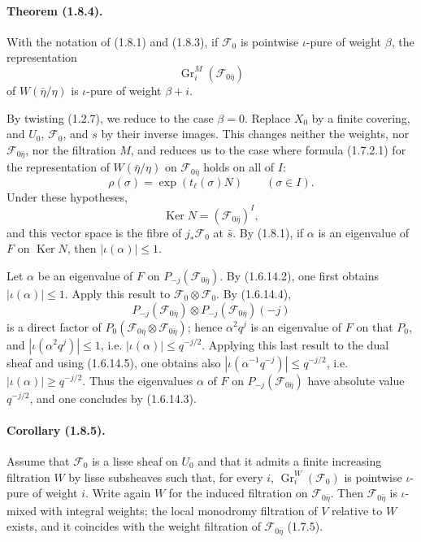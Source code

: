 \documentclass[11pt]{article}
\theoremstyle{remark}
\newcommand{\Gr}{\operatorname{Gr}}
\newcommand{\Ker}{\operatorname{Ker}}
\begin{document}
\paragraph{Theorem (1.8.4).}
With the notation of (1.8.1) and (1.8.3), if $\mathcal F_0$ is pointwise $\iota$-pure of weight $\beta$, the representation
\[
\Gr^M_i(\mathcal F_{0\bar\eta})
\]
of $W(\bar\eta/\eta)$ is $\iota$-pure of weight $\beta+i$.

By twisting (1.2.7), we reduce to the case $\beta=0$. Replace $X_0$ by a finite covering, and $U_0$, $\mathcal F_0$, and $s$ by their inverse images. This changes neither the weights, nor $\mathcal F_{0\bar\eta}$, nor the filtration $M$, and reduces us to the case where formula (1.7.2.1) for the representation of $W(\bar\eta/\eta)$ on $\mathcal F_{0\bar\eta}$ holds on all of $I$:
\[
\rho(\sigma)=\exp(t_\ell(\sigma)N)\qquad(\sigma\in I).
\]
Under these hypotheses,
\[
\Ker N=(\mathcal F_{0\bar\eta})^I,
\]
and this vector space is the fibre of $j_{*}\mathcal F_0$ at $\bar s$. By (1.8.1), if $\alpha$ is an eigenvalue of $F$ on $\Ker N$, then $|\iota(\alpha)|\le 1$.

Let $\alpha$ be an eigenvalue of $F$ on $P_{-j}(\mathcal F_{0\bar\eta})$. By (1.6.14.2), one first obtains $|\iota(\alpha)|\le1$. Apply this result to $\mathcal F_0\otimes\mathcal F_0$. By (1.6.14.4),
\[
P_{-j}(\mathcal F_{0\bar\eta})\otimes P_{-j}(\mathcal F_{0\bar\eta})(-j)
\]
is a direct factor of $P_0(\mathcal F_{0\bar\eta}\otimes\mathcal F_{0\bar\eta})$; hence $\alpha^2 q^j$ is an eigenvalue of $F$ on that $P_0$, and $|\iota(\alpha^2 q^j)|\le1$, i.e. $|\iota(\alpha)|\le q^{-j/2}$. Applying this last result to the dual sheaf and using (1.6.14.5), one obtains also $|\iota(\alpha^{-1}q^{-j})|\le q^{-j/2}$, i.e. $|\iota(\alpha)|\ge q^{-j/2}$. Thus the eigenvalues $\alpha$ of $F$ on $P_{-j}(\mathcal F_{0\bar\eta})$ have absolute value $q^{-j/2}$, and one concludes by (1.6.14.3).

\paragraph{Corollary (1.8.5).}
Assume that $\mathcal F_0$ is a lisse sheaf on $U_0$ and that it admits a finite increasing filtration $W$ by lisse subsheaves such that, for every $i$, $\Gr^W_i(\mathcal F_0)$ is pointwise $\iota$-pure of weight $i$. Write again $W$ for the induced filtration on $\mathcal F_{0\bar\eta}$. Then $\mathcal F_{0\bar\eta}$ is $\iota$-mixed with integral weights; the local monodromy filtration of $V$ relative to $W$ exists, and it coincides with the weight filtration of $\mathcal F_{0\bar\eta}$ (1.7.5).
\end{document}
